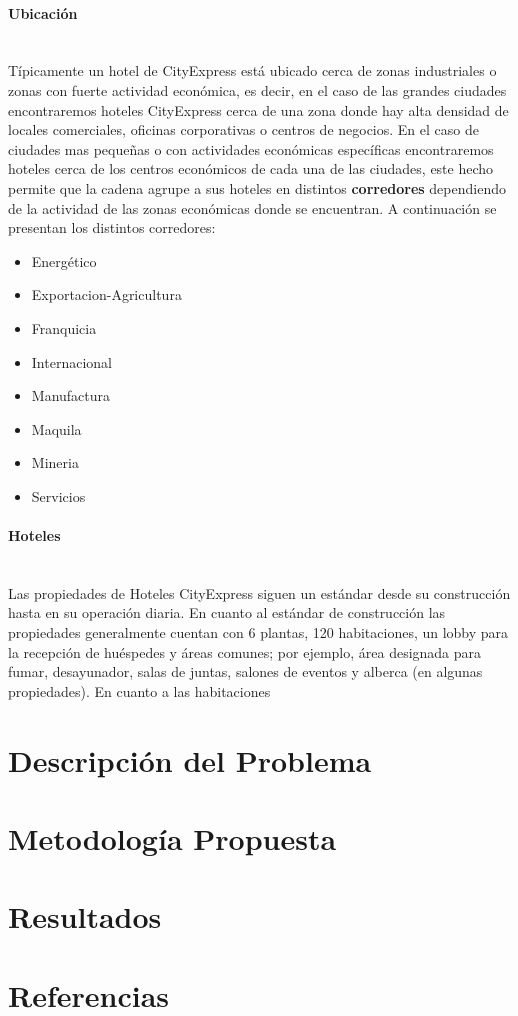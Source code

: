 \documentclass[a4paper,11pt]{article}
\begin{document}
\paragraph {Ubicación} ~ \\
Típicamente un hotel de CityExpress está ubicado cerca de zonas industriales o zonas con fuerte actividad económica, es decir, en el caso de las grandes ciudades encontraremos hoteles CityExpress cerca de una zona donde hay alta densidad de locales comerciales, oficinas corporativas o centros de negocios. En el caso de ciudades mas pequeñas o con actividades económicas específicas encontraremos hoteles cerca de los centros económicos de cada una de las ciudades, este hecho permite que la cadena agrupe a sus hoteles en distintos \textbf{corredores} dependiendo de la actividad de las zonas económicas donde se encuentran. A continuación se presentan los distintos corredores:
\begin{itemize}[noitemsep]
\item Energético
\item Exportacion-Agricultura
\item Franquicia
\item Internacional
\item Manufactura
\item Maquila
\item Mineria
\item Servicios
\end{itemize}
\paragraph {Hoteles} ~ \\
Las propiedades de Hoteles CityExpress siguen un estándar desde su construcción hasta en su operación diaria. En cuanto al estándar de construcción las propiedades generalmente cuentan con 6 plantas, 120 habitaciones, un lobby para la recepción de huéspedes y áreas comunes; por ejemplo, área designada para fumar, desayunador, salas de juntas, salones de eventos y alberca (en algunas propiedades). 
En cuanto a las habitaciones 

\section{Descripción del Problema}
\section{Metodología Propuesta}
\section{Resultados}
\section{Referencias}
\end{document}
